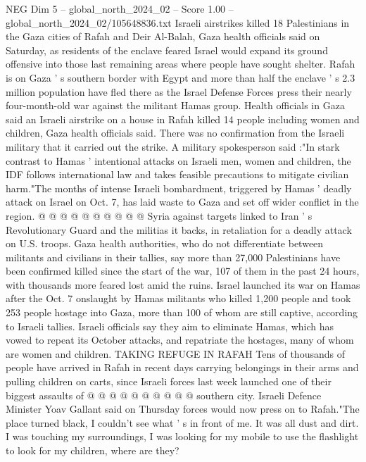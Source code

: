 \begin{textsample}{NEG Dim 5 – global\_north\_2024\_02 – Score 1.00 – global\_north\_2024\_02/105648836.txt}  \label{ex:f5_neg_219}
Israeli airstrikes killed 18 Palestinians in the Gaza cities of Rafah and Deir Al-Balah, Gaza health officials said on Saturday, as residents of the enclave feared Israel would expand its ground offensive into those last remaining areas where people have sought shelter.
Rafah is on Gaza ' s southern border with Egypt and more than half the enclave ' s 2.3 million population have fled there as the Israel Defense Forces press their nearly four-month-old war against the militant Hamas group.
Health officials in Gaza said an Israeli airstrike on a house in Rafah killed 14 people including women and children, Gaza health officials said.
There was no confirmation from the Israeli military that it carried out the strike.
A military spokesperson said :"In stark contrast to Hamas ' intentional attacks on Israeli men, women and children, the IDF follows international law and takes feasible precautions to mitigate civilian harm."The months of intense Israeli bombardment, triggered by Hamas ' deadly attack on Israel on Oct. 7, has laid waste to Gaza and set off wider conflict in the region. @ @ @ @ @ @ @ @ @ @ Syria against targets linked to Iran ' s Revolutionary Guard and the militias it backs, in retaliation for a deadly attack on U.S. troops.
Gaza health authorities, who do not differentiate between militants and civilians in their tallies, say more than 27,000 Palestinians have been confirmed killed since the start of the war, 107 of them in the past 24 hours, with thousands more feared lost amid the ruins.
Israel launched its war on Hamas after the Oct. 7 onslaught by Hamas militants who killed 1,200 people and took 253 people hostage into Gaza, more than 100 of whom are still captive, according to Israeli tallies.
Israeli officials say they aim to eliminate Hamas, which has vowed to repeat its October attacks, and repatriate the hostages, many of whom are women and children.
TAKING REFUGE IN RAFAH Tens of thousands of people have arrived in Rafah in recent days carrying belongings in their arms and pulling children on carts, since Israeli forces last week launched one of their biggest assaults of @ @ @ @ @ @ @ @ @ @ southern city.
Israeli Defence Minister Yoav Gallant said on Thursday forces would now press on to Rafah."The place turned black, I couldn't see what ' s in front of me.
It was all dust and dirt.
I was touching my surroundings, I was looking for my mobile to use the flashlight to look for my children, where are they?

\end{textsample}

